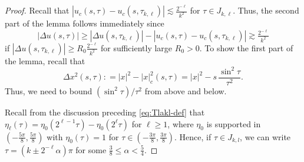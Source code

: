 \documentclass[leqno]{amsart}
\theoremstyle{definition}
\theoremstyle{remark}
\numberwithin{equation}{section}
\begin{document}
\begin{proof}
Recall that $\left|u_c(s,\tau)-u_c (s,\tau_{k,\ell}) \right| \lesssim \tfrac{2^{-\ell}}{k^2}$ for $\tau\in J_{k,\ell}$.
Thus, the second part of the lemma follows immediately since
\[
|\Delta u(s,\tau)| \ge \left|\Delta u(s,\tau_{k,\ell})\right| -\left|u_c(s,\tau)-u_c(s,\tau_{k,\ell}) \right| \gtrsim \tfrac{2^{-\ell}}{k^2}
\]
if $\left|\Delta u(s,\tau_{k,\ell})\right| \ge R_0  \tfrac{2^{-\ell}}{k^2}$ for sufficiently large $R_0 > 0$.
To show the first part of the lemma, recall that 
\[
\Delta x^2 (s,\tau): = |x|^2-|x|_{c}^2 (s,\tau) = |x|^2-s \, \frac{\sin^2\tau}{\tau^2}.
\]
Thus, we need to bound $(\sin ^2 \tau)/\tau^2 $ from above and below.

Recall from the discussion preceding \eqref{eq:Tlakl-def} that $\eta_\ell(\tau) = \eta_{0}(2^{\ell-1} \tau)-\eta_{0}(2^{\ell} \tau)$ for $\ell \ge 1$, where $\eta_0$ is supported in ${(-\frac{5 \pi}{8}, \frac{5 \pi}{8})}$ with $\eta_0(\tau) = 1$ for ${\tau \in(-\frac{3 \pi}{8}, \frac{3 \pi}{8})}$. Hence, if $\tau\in J_{k,l}$, we can write $\tau = (k \pm 2^{-\ell} \alpha) \pi$ for some $\frac{3}{8} \le \alpha<\frac{5}{4}$.


\end{proof}
\end{document}
